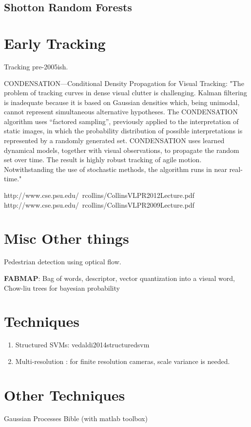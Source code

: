 \subsection{Shotton Random Forests}

\section{Early Tracking}
Tracking pre-2005ish.

CONDENSATION—Conditional Density Propagation for Visual Tracking: "The problem of tracking curves in dense visual clutter is challenging. Kalman filtering is inadequate because it is based on Gaussian densities which, being unimodal, cannot represent simultaneous alternative hypotheses. The CONDENSATION algorithm uses ``factored sampling'', previously applied to the interpretation of static images, in which the probability distribution of possible interpretations is represented by a randomly generated set. CONDENSATION uses learned dynamical models, together with visual observations, to propagate the random set over time. The result is highly robust tracking of agile motion. Notwithstanding the use of stochastic methods, the algorithm runs in near real-time."

http://www.cse.psu.edu/~rcollins/CollinsVLPR2012Lecture.pdf
http://www.cse.psu.edu/~rcollins/CollinsVLPR2009Lecture.pdf

\section{Misc Other things}

Pedestrian detection using optical flow. \cite{benenson2014ten}

\textbf{FABMAP}:
Bag of words,  descriptor, vector quantization into a visual word, Chow-liu trees for bayesian probability

\section{Techniques}
\begin{enumerate}
\item Structured SVMs: vedaldi2014structuredsvm
\item Multi-resolution \cite{park2010multiresolution}: for finite resolution cameras, scale variance is needed.
\end{enumerate}

\section{Other Techniques}
Gaussian Processes Bible (with matlab toolbox) \cite{rasmussen2006gaussian}